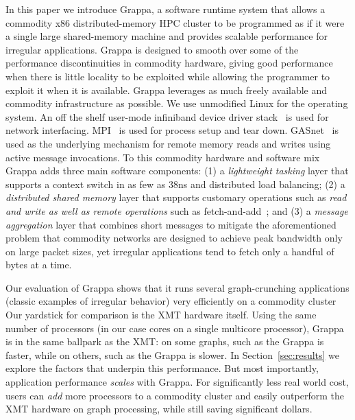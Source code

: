 In this paper we introduce Grappa, a software runtime system that allows
a commodity x86 distributed-memory HPC cluster to be programmed as if it
were a single large shared-memory machine and provides scalable
performance for irregular applications. Grappa is designed to smooth
over some of the performance discontinuities in commodity hardware,
giving good performance when there is little locality to be exploited
while allowing the programmer to exploit it when it is available. Grappa
leverages as much freely available and commodity infrastructure as
possible. We use unmodified Linux for the operating system. An off the
shelf user-mode infiniband device driver stack~\cite{Melonox?} is used
for network interfacing. MPI~\cite{mpi} is used for process setup and
tear down. GASnet~\cite{gasnet} is used as the underlying mechanism for
remote memory reads and writes using active message invocations. To this
commodity hardware and software mix Grappa adds three main software
components: (1) a \emph{lightweight tasking} layer that supports a
context switch in as few as 38ns and distributed load balancing; (2) a
\emph{distributed shared memory} layer that supports customary
operations such as \emph{read and write as well as remote operations}
such as fetch-and-add~\cite{fetchandadd}; and (3) a \emph{message
aggregation} layer that combines short messages to mitigate the
aforementioned problem that commodity networks are designed to achieve
peak bandwidth only on large packet sizes, yet irregular applications
tend to fetch only a handful of bytes at a time.


% 
% 

Our evaluation of Grappa shows that it runs several graph-crunching applications (classic examples of irregular behavior) very efficiently on a commodity cluster  Our yardstick for comparison is the XMT hardware itself.  Using the same number of processors (in our case cores on a single multicore processor), Grappa is in the same ballpark as the XMT: on some graphs, such as the  Grappa is  faster, while on others, such as the  Grappa is  slower.  In Section~\ref{sec:results} we explore the factors that underpin this performance.  But most importantly, application performance \emph{scales} with Grappa.  For significantly less real world cost, users can \emph{add} more processors to a commodity cluster and easily outperform the XMT hardware on graph processing, while still saving significant dollars.
% 


